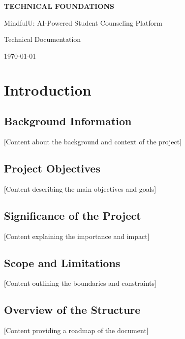 \documentclass[11pt,a4paper]{article}
\begin{document}
\begin{titlepage}
    \centering
    \vspace*{2cm}
    {\Huge\bfseries TECHNICAL FOUNDATIONS\par}
    \vspace{1cm}
    {\LARGE MindfulU: AI-Powered Student Counseling Platform\par}
    \vspace{2cm}
    {\Large Technical Documentation\par}
    \vfill
    {\large \today\par}
\end{titlepage}

\tableofcontents
\newpage

\section{Introduction}

\subsection{Background Information}
[Content about the background and context of the project]

\subsection{Project Objectives}
[Content describing the main objectives and goals]

\subsection{Significance of the Project}
[Content explaining the importance and impact]

\subsection{Scope and Limitations}
[Content outlining the boundaries and constraints]

\subsection{Overview of the Structure}
[Content providing a roadmap of the document]
\end{document}
